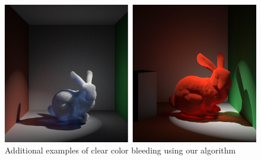 \documentclass[runningheads]{llncs}
\begin{document}
\begin{figure}
    \centering
   \includegraphics[width=120mm]{img/Two_Bunnies.png}
    \caption{Additional examples of clear color bleeding using our algorithm}
    \label{fig:examples}
\end{figure}




\end{document}
